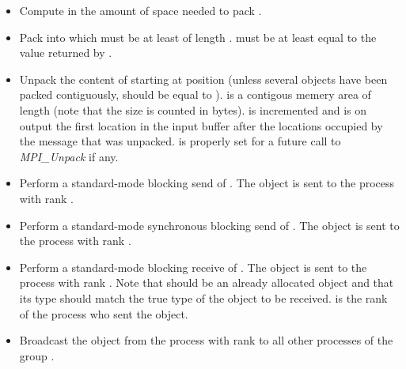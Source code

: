 \begin{itemize}
\item {}
  \sshortdescribe Compute in  the amount of space needed to pack .
\item {}
  \sshortdescribe Pack  into  which must be at least of
  length .  must be at least equal to the value returned
  by . 
\item {}
  \sshortdescribe Unpack the content of  starting at position
   (unless several objects have been packed contiguously,  should be equal to ).  is a contigous memery area
  of length  (note that the size is counted in bytes).
   is incremented and is on output the first location in the input
  buffer after the locations occupied by the message that was
  unpacked.  is properly set for a future call to {\it MPI_Unpack}
  if any.
  
\item {}
  \sshortdescribe Perform a standard-mode blocking send of . The
  object is sent to the process with rank .

\item {}
  \sshortdescribe Perform a standard-mode synchronous blocking send of
  . The object is sent to the process with rank .
  
\item {} 
  \sshortdescribe Perform a standard-mode blocking receive of . The
  object is sent to the process with rank . Note that 
  should be an already allocated object and that its type should match the
  true type of the object to be received.  is the rank of the
  process who sent the object.

  
\item {}
  \sshortdescribe Broadcast the object  from the process with rank
   to all other processes of the group .


\end{itemize}

